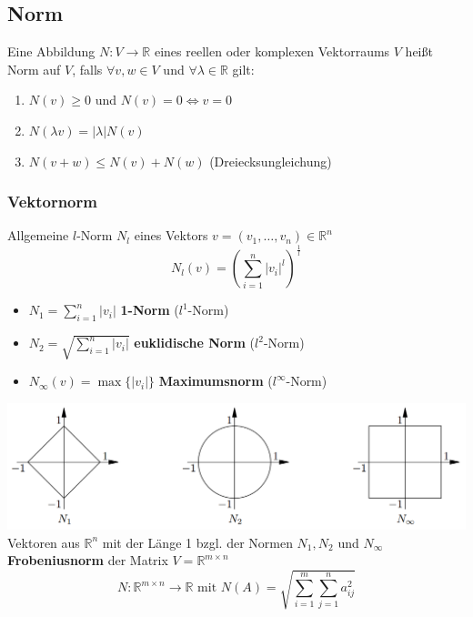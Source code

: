 \documentclass[6pt,a4paper]{scrartcl}
\newcommand{\abs}[1]{\ensuremath{\left\vert#1\right\vert}}
\newcommand{\enbrace}[1]{\ensuremath{\left(#1\right)}}
\begin{document}
\begin{multicols*}{4}
\subsection{Norm}
Eine Abbildung $N: V\rightarrow \mathbb{R}$ eines reellen oder komplexen Vektorraums $V$ heißt Norm auf $V$, falls $\forall v,w\in V$ und $\forall \lambda\in\mathbb{R}$ gilt:
\begin{enumerate}\itemsep0pt
\item $N(v)\ge0$ \quad und \quad $N(v)=0 \Leftrightarrow v=0$
\item $N(\lambda v)=\abs{\lambda}N(v)$
\item $N(v+w)\le N(v) + N(w)$ \quad (Dreiecksungleichung)
\end{enumerate}
\subsubsection{Vektornorm}
Allgemeine $l$-Norm $N_l$ eines Vektors $v=(v_1,\dots,v_n)\in \mathbb{R}^n$
\begin{equation*}
N_l(v)=\enbrace{\sum_{i=1}^{n}\abs{v_i}^l}^{\frac{1}{l}}
\end{equation*}
\begin{itemize}\itemsep0pt
\item $N_1=\sum_{i=1}^{n}\abs{v_i}$ \qquad  \textbf{1-Norm} ($l^1$-Norm) \\
\item $N_2=\sqrt{\sum_{i=1}^{n}\abs{v_i}}$ \qquad  \textbf{euklidische Norm} ($l^2$-Norm)
\item $N_\infty(v)=\max\{\abs{v_i}\}$ \qquad \textbf{Maximumsnorm} ($l^\infty$-Norm)
\end{itemize}
\includegraphics[width=\linewidth]{./img/norms.png} \\
Vektoren aus $\mathbb{R}^n$ mit der Länge 1 bzgl. der Normen $N_1, N_2$ und $N_\infty$\\
\textbf{Frobeniusnorm} der Matrix $V=\mathbb{R}^{m\times n}$
\begin{equation*} 
N:\mathbb{R}^{m\times n}\rightarrow\mathbb{R} \text{ mit } N(A)=\sqrt{\sum_{i=1}^{m}\sum_{j=1}^{n}a_{ij}^2}
\end{equation*}

\end{multicols*}
\end{document}
